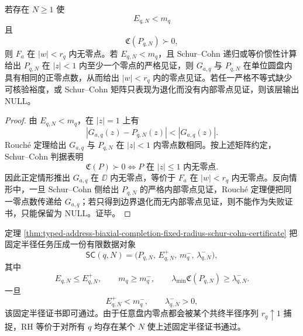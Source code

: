 \begin{theorem}\label{thm:typed-address-biaxial-completion-fixed-radius-schur-cohn-certificate}
若存在 \(N\ge1\) 使
\[
E_{q,N}<m_q
\]
且
\[
\mathfrak C(P_{q,N})\succ0,
\]
则 \(F_a\) 在 \(|w|<r_q\) 内无零点。若 \(E_{q,N}<m_q\)，且 Schur--Cohn 递归或等价惯性计算给出 \(P_{q,N}\) 在 \(|z|<1\) 内至少一个零点的严格见证，则 \(G_{a,q}\) 与 \(P_{q,N}\) 在单位圆盘内具有相同的正零点数，从而给出 \(|w|<r_q\) 内的零点见证。若任一严格不等式缺少可核验裕度，或 Schur--Cohn 矩阵只表现为退化而没有内部零点见证，则该层输出 \(\mathrm{NULL}\)。
\end{theorem}
\begin{proof}
由 \(E_{q,N}<m_q\)，在 \(|z|=1\) 上有
\[
|G_{a,q}(z)-P_{q,N}(z)|<|G_{a,q}(z)|.
\]
Rouch\'e 定理给出 \(G_{a,q}\) 与 \(P_{q,N}\) 在 \(|z|<1\) 内零点数相同。按上述矩阵约定，Schur--Cohn 判据表明
\[
\mathfrak C(P)\succ0
\iff
P\text{ 在 }|z|\le1\text{ 内无零点}.
\]
因此正定情形推出 \(G_{a,q}\) 在 \(\DD\) 内无零点，等价于 \(F_a\) 在 \(|w|<r_q\) 内无零点。反向情形中，一旦 Schur--Cohn 侧给出 \(P_{q,N}\) 的严格内部零点见证，Rouch\'e 定理便把同一零点数传递给 \(G_{a,q}\)；若只得到边界退化而无内部零点见证，则不能作为失败证书，只能保留为 \(\mathrm{NULL}\)。证毕。
\end{proof}

定理 \ref{thm:typed-address-biaxial-completion-fixed-radius-schur-cohn-certificate} 把固定半径任务压成一份有限数据对象
\[
\mathsf{SC}(q,N)
=
\bigl(P_{q,N},\,E_{q,N}^+,\,m_q^-,\,\lambda_{q,N}^-\bigr),
\]
其中
\[
E_{q,N}\le E_{q,N}^+,
\qquad
m_q\ge m_q^-,
\qquad
\lambda_{\min}\mathfrak C(P_{q,N})\ge \lambda_{q,N}^-.
\]
一旦
\[
E_{q,N}^+<m_q^-,
\qquad
\lambda_{q,N}^->0,
\]
该固定半径证书即可通过。由于任意盘内零点都会被某个共终半径序列 \(r_q\uparrow1\) 捕捉，RH 等价于对所有 \(q\) 均存在某个 \(N\) 使上述固定半径证书通过。


